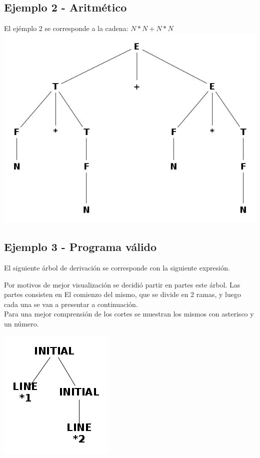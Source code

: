 \subsection{Ejemplo 2 - Aritm\'etico}
El ej\'emplo 2 se corresponde a la cadena:
$N*N+N*N$
\includegraphics[scale=0.40]{arboles_derivacion/ejemplo2.jpg}


\subsection{Ejemplo 3 - Programa v\'alido}
El siguiente \'arbol de derivaci\'on se corresponde con la siguiente expresi\'on.



Por motivos de mejor visualizaci\'on se decidi\'o partir en partes este \'arbol. Las partes consisten en El comienzo del mismo, que se divide en 2 ramas, y luego cada una se van a presentar a continuaci\'on.
\\
Para una mejor comprensi\'on de los cortes se muestran los mismos con asterisco y un n\'umero.

\centerline{\includegraphics[scale=0.40]{arboles_derivacion/union_cube1_cube2.jpg}}

